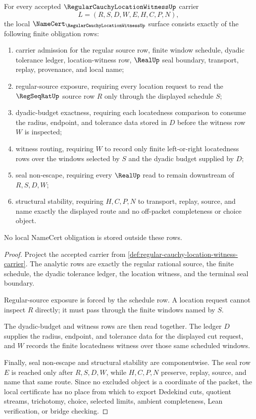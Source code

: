 \begin{theorem}
\label{thm:regular-cauchy-location-witness-namecert-obligations}
For every accepted $\RegularCauchyLocationWitnessUp$ carrier
$$
L=(R,S,D,W,E,H,C,P,N),
$$
the local $\NameCert_{\RegularCauchyLocationWitnessUp}$ surface consists exactly of the following finite obligation rows:
\begin{enumerate}
\item carrier admission for the regular source row, finite window schedule, dyadic tolerance ledger, location-witness row, $\RealUp$ seal boundary, transport, replay, provenance, and local name;
\item regular-source exposure, requiring every location request to read the $\RegSeqRatUp$ source row $R$ only through the displayed schedule $S$;
\item dyadic-budget exactness, requiring each locatedness comparison to consume the radius, endpoint, and tolerance data stored in $D$ before the witness row $W$ is inspected;
\item witness routing, requiring $W$ to record only finite left-or-right locatedness rows over the windows selected by $S$ and the dyadic budget supplied by $D$;
\item seal non-escape, requiring every $\RealUp$ read to remain downstream of $R,S,D,W$;
\item structural stability, requiring $H,C,P,N$ to transport, replay, source, and name exactly the displayed route and no off-packet completeness or choice object.
\end{enumerate}
No local NameCert obligation is stored outside these rows.
\end{theorem}
\begin{proof}
Project the accepted carrier from \autoref{def:regular-cauchy-location-witness-carrier}. The analytic rows are exactly the regular rational source, the finite schedule, the dyadic tolerance ledger, the location witness, and the terminal seal boundary.

Regular-source exposure is forced by the schedule row. A location request cannot inspect $R$ directly; it must pass through the finite windows named by $S$.

The dyadic-budget and witness rows are then read together. The ledger $D$ supplies the radius, endpoint, and tolerance data for the displayed cut request, and $W$ records the finite locatedness witness over those same scheduled windows.

Finally, seal non-escape and structural stability are componentwise. The seal row $E$ is reached only after $R,S,D,W$, while $H,C,P,N$ preserve, replay, source, and name that same route. Since no excluded object is a coordinate of the packet, the local certificate has no place from which to export Dedekind cuts, quotient streams, trichotomy, choice, selected limits, ambient completeness, Lean verification, or bridge checking.
\end{proof}

